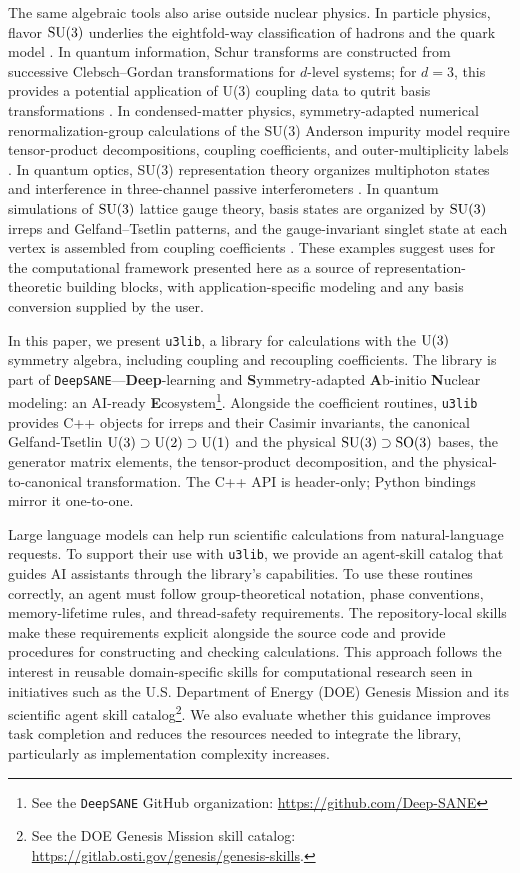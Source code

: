 \documentclass[aps,onecolumn,10pt,superscriptaddress,floatfix,nofootinbib]{revtex4}
\begin{document}
The same algebraic tools also arise outside nuclear physics. In particle
physics, flavor $\rm SU(3)$ underlies the eightfold-way classification of
hadrons and the quark model \cite{GellMann1962PR,Neeman1961NP}. In quantum
information, Schur transforms are constructed from successive Clebsch--Gordan
transformations for $d$-level systems; for $d=3$, this provides a potential
application of U(3) coupling data to qutrit basis transformations
\cite{Bacon2006PRL}. In condensed-matter physics, symmetry-adapted numerical
renormalization-group calculations of the SU(3) Anderson impurity model require
tensor-product decompositions, coupling coefficients, and
outer-multiplicity labels \cite{Moca2012PRB}. In quantum optics, SU(3)
representation theory organizes multiphoton states and interference in
three-channel passive interferometers \cite{Tan2013PRL}. In quantum simulations
of $\rm SU(3)$ lattice gauge theory, basis states are organized by $\rm SU(3)$
irreps and Gelfand--Tsetlin patterns, and the gauge-invariant singlet state at
each vertex is assembled from coupling coefficients \cite{Draper2026}. These
examples suggest
uses for the computational framework presented here as a source of
representation-theoretic building blocks, with application-specific modeling and
any basis conversion supplied by the user.

In this paper, we present \texttt{u3lib}, a library for calculations with the
$\rm U(3)$ symmetry algebra, including coupling and recoupling coefficients.
The library is part of
\texttt{DeepSANE}---\textbf{Deep}-learning and \textbf{S}ymmetry-adapted \textbf{A}b-initio 
\textbf{N}uclear modeling: an AI-ready \textbf{E}cosystem\footnote{See the \texttt{DeepSANE} GitHub organization: 
\url{https://github.com/Deep-SANE}}. 
Alongside the coefficient routines, \texttt{u3lib} provides C++ objects for irreps
and their Casimir invariants, the canonical
Gelfand-Tsetlin $\rm U(3) \supset U(2) \supset U(1)$ and the physical $\rm SU(3) \supset SO(3)$ bases, 
the generator matrix elements, the tensor-product decomposition, and the physical-to-canonical transformation. 
The C++ API is header-only; Python bindings mirror it one-to-one.

Large language models can help run scientific calculations from
natural-language requests. To support their use with \texttt{u3lib}, we provide
an agent-skill catalog that guides AI assistants through the library's
capabilities. To use these routines correctly, an agent must follow group-theoretical notation,
phase conventions, memory-lifetime rules, and thread-safety requirements.
The repository-local skills make these requirements explicit alongside the
source code and provide procedures for constructing and checking calculations.
This approach follows the interest in reusable domain-specific skills for
computational research seen in initiatives such as the U.S.
Department of Energy (DOE) Genesis Mission and its scientific agent skill 
catalog\footnote{See the DOE Genesis Mission skill catalog: \url{https://gitlab.osti.gov/genesis/genesis-skills}.}.
We also evaluate whether this guidance improves task completion and
reduces the resources needed to integrate the library, particularly as
implementation complexity increases. 
\end{document}
